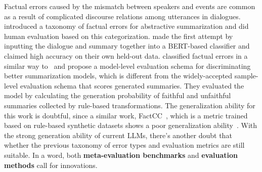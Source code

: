 Factual errors caused by the mismatch between speakers and events are 
common as a result of complicated discourse relations among utterances 
in dialogues. \citet{tang2021confit} introduced a taxonomy of factual errors for abstractive summarization and did human evaluation based on this categorization. \citet{liu2021controllable} made the first attempt by inputting the 
dialogue and summary together into a BERT-based classifier and claimed 
high accuracy on their own held-out data. \citet{wang2022analyzing} classified factual errors in a similar way to~\citet{tang2021confit} and propose a model-level evaluation schema for discriminating better summarization models, which is different from the widely-accepted sample-level evaluation schema that scores generated summaries. They evaluated the model by calculating the generation probability of faithful and unfaithful summaries collected by rule-based transformations. The generalization ability for this work is doubtful, since a similar work, FactCC~\cite{kryscinski2020evaluating}, which is a metric trained based on rule-based synthetic datasets shows a poor generalization ability~\cite{laban2022summac}. With the strong generation ability of current LLMs, there's another doubt that whether the previous taxonomy of error types and evaluation metrics are still suitable.
In a word, both \textbf{meta-evaluation benchmarks} and \textbf{evaluation methods} call for innovations.



